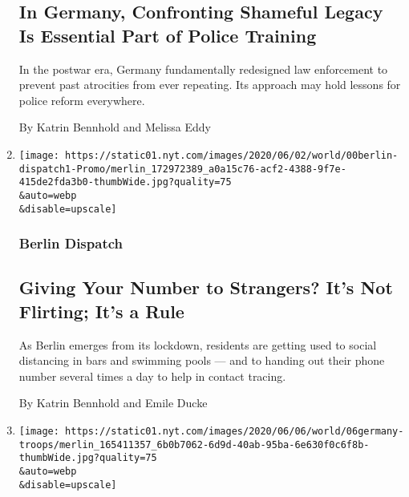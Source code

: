 \begin{enumerate}
  \hypertarget{in-germany-confronting-shameful-legacy-is-essential-part-of-police-training}{%
  \subsection{In Germany, Confronting Shameful Legacy Is Essential Part
  of Police
  Training}\label{in-germany-confronting-shameful-legacy-is-essential-part-of-police-training}}

  In the postwar era, Germany fundamentally redesigned law enforcement
  to prevent past atrocities from ever repeating. Its approach may hold
  lessons for police reform everywhere.

  By Katrin Bennhold and Melissa Eddy
\item
  \href{/2020/06/07/world/europe/germany-coronavirus-reopening.html}{}

  \texttt{[image: https://static01.nyt.com/images/2020/06/02/world/00berlin-dispatch1-Promo/merlin\_172972389\_a0a15c76-acf2-4388-9f7e-415de2fda3b0-thumbWide.jpg?quality=75\\\&auto=webp\\\&disable=upscale]}

  \hypertarget{berlin-dispatch}{%
  \subsubsection{Berlin Dispatch}\label{berlin-dispatch}}

  \hypertarget{giving-your-number-to-strangers-its-not-flirting-its-a-rule}{%
  \subsection{Giving Your Number to Strangers? It's Not Flirting; It's a
  Rule}\label{giving-your-number-to-strangers-its-not-flirting-its-a-rule}}

  As Berlin emerges from its lockdown, residents are getting used to
  social distancing in bars and swimming pools --- and to handing out
  their phone number several times a day to help in contact tracing.

  By Katrin Bennhold and Emile Ducke
\item
  \href{/2020/06/06/world/europe/germany-troop-withdrawal-america.html}{}

  \texttt{[image: https://static01.nyt.com/images/2020/06/06/world/06germany-troops/merlin\_165411357\_6b0b7062-6d9d-40ab-95ba-6e630f0c6f8b-thumbWide.jpg?quality=75\\\&auto=webp\\\&disable=upscale]}

  \hypertarget{has-america-first-become-trump-first-germans-wonder}{%
}
\end{enumerate}

